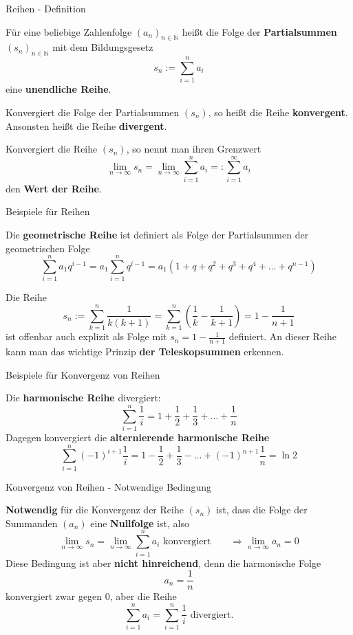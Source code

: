 \begin{frame}{Reihen - Definition}
	\begin{definition}
	Für eine beliebige Zahlenfolge $(a_{n})_{n \in \mathbb{N}}$ heißt die Folge der \textbf{Partialsummen} $(s_{n})_{n \in \mathbb{N}}$ mit dem Bildungsgesetz
	\[
		s_{n} := \sum_{i=1}^{n} a_{i}
	\]
	eine \textbf{unendliche Reihe}.
	
	Konvergiert die Folge der Partialsummen $(s_n)$, so heißt die Reihe \textbf{konvergent}. Ansonsten heißt die Reihe \textbf{divergent}.
	
	Konvergiert die Reihe $(s_{n})$, so nennt man ihren Grenzwert 
	\[
		\lim_{n \to \infty} s_{n} = \lim_{n \to \infty} \sum_{i=1}^{n} a_{i} =: \sum_{i=1}^{\infty} a_{i} 
 	\]
 	den \textbf{Wert der Reihe}.
	\end{definition}	
\end{frame}

\begin{frame}{Beispiele für Reihen}
	\begin{example}
		Die \textbf{geometrische Reihe} ist definiert als Folge der Partialsummen der geometrischen Folge 
		\[
			\sum_{i=1}^{n} a_{1} q^{i-1} = a_{1} \sum_{i=1}^{n} q^{i-1} = a_{1} \left( 1 + q + q^{2} + q^{3} + q^{4} + \ldots + q^{n-1}\right)
		\]
	\end{example}
	\begin{example}
		Die Reihe 
		\[
			s_{n}:= \sum_{k=1}^{n} \frac{1}{k(k+1)} = \sum_{k=1}^{n} \left( \frac{1}{k} - \frac{1}{k+1} \right) = 1 - \frac{1}{n+1}
		\] 
		ist offenbar auch explizit als Folge mit $s_{n} = 1-\frac{1}{n+1}$ definiert. An dieser Reihe kann man das wichtige Prinzip \textbf{der Teleskopsummen} erkennen.
	\end{example}
\end{frame}

\begin{frame}{Beispiele für Konvergenz von Reihen}
	\begin{example}
		Die \textbf{harmonische Reihe} divergiert:
		\[
			\sum_{i=1}^{n} \frac{1}{i} = 1 + \frac{1}{2} + \frac{1}{3} + \ldots + \frac{1}{n}
		\] 
		Dagegen konvergiert die \textbf{alternierende harmonische Reihe} 
		\[
			\sum_{i=1}^{n} (-1)^{i+1} \frac{1}{i} = 1 - \frac{1}{2} + \frac{1}{3} - \ldots + (-1)^{n+1} \frac{1}{n} = \ln 2
		\]
	\end{example}
\end{frame}

\begin{frame}{Konvergenz von Reihen - Notwendige Bedingung}
	\begin{bemerkung}
		\textbf{Notwendig} für die Konvergenz der Reihe $(s_{n})$ ist, dass die Folge der Summanden $(a_{n})$ eine \textbf{Nullfolge} ist, also 
		\[
			\lim_{n \to \infty} s_{n} = \lim_{n \to \infty} \sum_{i=1}^{n} a_{i} \mbox{ konvergiert} \qquad \Rightarrow \lim_{n \to \infty} a_{n} = 0 
		\]
		Diese Bedingung ist aber \textbf{nicht hinreichend}, denn die harmonische Folge 
		\[
			a_{n} = \frac{1}{n} 
		\]
		konvergiert zwar gegen 0, aber die Reihe
		\[
			\sum_{i=1}^{n} a_{i} = \sum_{i=1}^{n} \frac{1}{i} \mbox{ divergiert.}
		\]
	\end{bemerkung}
\end{frame}


